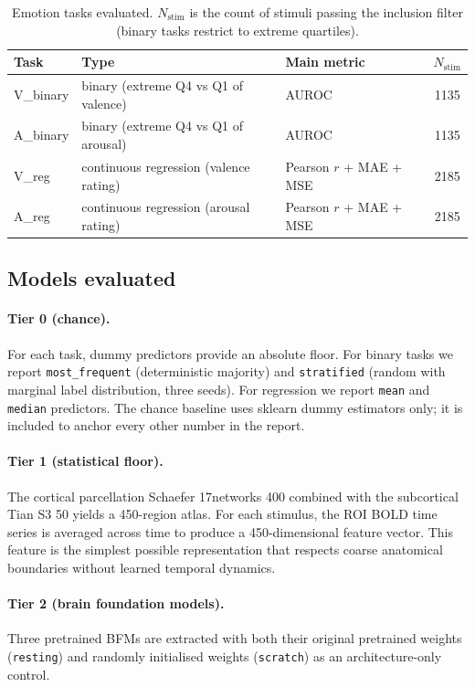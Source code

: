 \documentclass[11pt, a4paper]{article}
\begin{document}
\begin{table}[h]
\centering
\caption{Emotion tasks evaluated. $N_{\text{stim}}$ is the count of stimuli passing the
inclusion filter (binary tasks restrict to extreme quartiles).}
\label{tab:tasks}
\small
\begin{tabular}{lllc}
\toprule
Task & Type & Main metric & $N_{\text{stim}}$ \\
\midrule
V\_binary    & binary (extreme Q4 vs Q1 of valence)         & AUROC      & 1135 \\
A\_binary    & binary (extreme Q4 vs Q1 of arousal)         & AUROC      & 1135 \\
V\_reg       & continuous regression (valence rating)       & Pearson $r$ + MAE + MSE & 2185 \\
A\_reg       & continuous regression (arousal rating)       & Pearson $r$ + MAE + MSE & 2185 \\
\bottomrule
\end{tabular}
\end{table}

\subsection{Models evaluated}
\label{sec:models}

\paragraph{Tier 0 (chance).} For each task, dummy predictors provide an absolute floor.
For binary tasks we report \texttt{most\_frequent} (deterministic majority) and
\texttt{stratified} (random with marginal label distribution, three seeds). For regression
we report \texttt{mean} and \texttt{median} predictors. The chance baseline uses sklearn
dummy estimators only; it is included to anchor every other number in the report.

\paragraph{Tier 1 (statistical floor).} The cortical parcellation Schaefer 17networks 400
combined with the subcortical Tian S3 50 yields a 450-region atlas. For each stimulus, the
ROI BOLD time series is averaged across time to produce a 450-dimensional feature vector.
This feature is the simplest possible representation that respects coarse anatomical
boundaries without learned temporal dynamics.

\paragraph{Tier 2 (brain foundation models).} Three pretrained BFMs are extracted with
both their original pretrained weights (\texttt{resting}) and randomly initialised
weights (\texttt{scratch}) as an architecture-only control.
\end{document}
